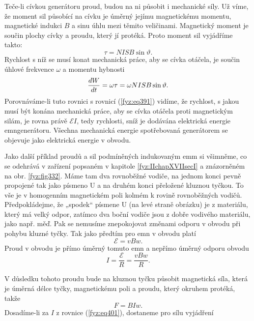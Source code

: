   Teče-li cívkou generátoru proud, budou na ni působit i mechanické síly. Už víme, že moment sil 
  působící na cívku je úměrný jejímu magnetickému momentu, magnetické indukci \(B\) a sinu úhlu 
  mezi těmito veličinami. Magnetický moment je součin plochy cívky a proudu, který jí protéká. 
  Proto moment sil vyjádříme takto:
  \begin{equation}\label{fyz:eq398}
    \tau = NISB\sin\vartheta.
  \end{equation}
  Rychlost s níž se musí konat mechanická práce, aby se cívka otáčela, je součin úhlové frekvence 
  \(\omega\) a momentu hybnosti
  \begin{equation}\label{fyz:eq399}
    \dfrac{d W}{d t} = \omega\tau = \omega NISB\sin\vartheta.
  \end{equation}
  Porovnáváme-li tuto rovnici s rovnicí (\ref{fyz:eq391}) vidíme, že rychlost, s jakou musí být 
  konána mechanická práce, aby se cívka otáčela proti magnetickým silám, je rovna právě 
  \(\mathscr{E}I\), tedy rychlosti, sníž je dodávána elektrická energie emngenerátoru. Všechna 
  mechanická energie spotřebovaná generátorem se objevuje jako elektrická energie v obvodu.
 
  Jako další příklad proudů a sil podmíněných indukovaným emm si všimněme, co se odehrává
  v zařízení popsaném v kapitole \ref{fyz:IIchapXVIIsecI} a znázorněném na obr. \ref{fyz:fig332}. 
  Máme tam dva rovnoběžné vodiče, na jednom konci pevně propojené tak jako písmeno U a na druhém 
  konci přeložené kluznou tyčkou. To vše je v homogenním magnetickém poli kolmém k rovině 
  rovnoběžných vodičů. Předpokládejme, že „spodek“ písmene U (na levé straně obrázku) je z 
  materiálu, který má velký odpor, zatímco dva boční vodiče jsou z dobře vodivého materiálu, jako 
  např. měď. Pak se nemusíme znepokojovat změnami odporu v obvodu při pohybu kluzné tyčky. Tak jako 
  předtím pro emn v obvodu platí
  \begin{equation}\label{fyz:eq400}
    \mathscr{E} = vBw.
  \end{equation}
  Proud v obvodu je přímo úměrný tomuto emn a nepřímo úměrný odporu obvodu
  \begin{equation}\label{fyz:eq401}
    I = \frac{\mathscr{E}}{R} = \frac{vBw}{R}.
  \end{equation}
  
  V důsledku tohoto proudu bude na kluznou tyčku působit magnetická síla, která je úměrná délce 
  tyčky, magnetickému poli a proudu, který okruhem protéká, takže
  \begin{equation}\label{fyz:eq402}
    F = BIw.
  \end{equation}
  Dosadíme-li za \(I\) z rovnice (\ref{fyz:eq401}), dostaneme pro sílu vyjádření
  
